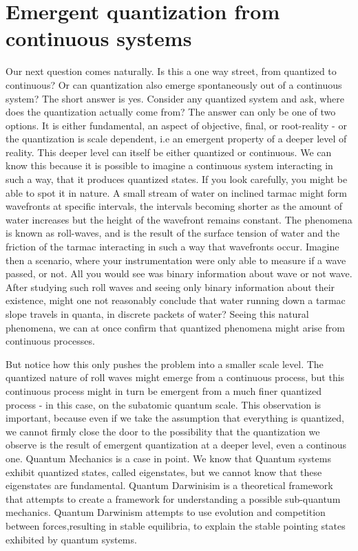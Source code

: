 \documentclass[notitlepage]{report}
\begin{document}
\section*{Emergent quantization from continuous systems}
Our next question comes naturally. Is this a one way street, from quantized to continuous? Or can quantization also emerge spontaneously out of  a continuous system? The short answer is yes. Consider any quantized system and ask, where does the quantization actually come from? The answer can only be one of two options. It is either fundamental, an aspect of objective, final, or root-reality  - or the quantization is scale dependent, i.e an emergent property of a deeper level of reality. This deeper level can itself be either quantized or continuous. 
We can know this because it is possible to imagine a continuous system interacting in such a way, that it produces quantized states. If you look carefully, you might be able to spot it in nature. A small stream of water on inclined tarmac might form wavefronts at specific intervals, the intervals becoming shorter as the amount of water increases but the height of the wavefront remains constant. The phenomena is known as roll-waves, and is the result of the surface tension of water and the friction of the tarmac interacting in such a way that wavefronts occur. 
Imagine then a scenario, where your instrumentation were only able to measure if a wave passed, or not. All you would see was binary information about wave or not wave. After studying such roll waves and seeing only binary information about their existence, might one  not reasonably conclude that water running down a tarmac slope travels in quanta, in discrete packets of water? Seeing this natural phenomena, we can at once confirm that quantized phenomena might arise from continuous processes. 

But notice how this only pushes the problem into a smaller scale level. The quantized nature of roll waves might emerge from a continuous process, but this continuous process might in turn be emergent from a much finer quantized process - in this case, on the subatomic quantum scale. This observation is important, because even if we take the assumption that everything is quantized, we cannot firmly close the door to the possibility that the quantization we observe is the result of emergent quantization at a deeper level, even a continous one.
Quantum Mechanics is a case in point. We know that Quantum systems exhibit quantized states, called eigenstates, but we cannot know that these eigenstates are fundamental. Quantum Darwinisim is a theoretical framework that attempts to create a framework for understanding a possible sub-quantum mechanics. Quantum Darwinism attempts to use evolution and competition between forces,resulting in stable equilibria, to explain the stable pointing states exhibited by quantum systems. 
\end{document}
